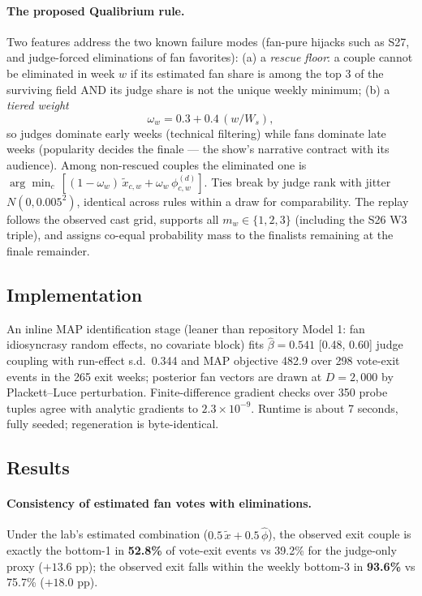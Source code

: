 \paragraph{The proposed Qualibrium rule.} Two features address the two known
failure modes (fan-pure hijacks such as S27, and judge-forced eliminations of fan
favorites): (a) a \emph{rescue floor}: a couple cannot be eliminated in week $w$
if its estimated fan share is among the top 3 of the surviving field AND its judge
share is not the unique weekly minimum; (b) a \emph{tiered weight}
\begin{equation}
\omega_w = 0.3 + 0.4\,(w/W_s),
\label{eq:omega}
\end{equation}
so judges dominate early weeks (technical filtering) while fans dominate late
weeks (popularity decides the finale --- the show's narrative contract with its
audience). Among non-rescued couples the eliminated one is
$\arg\min_c\,[(1-\omega_w)\,\tilde x_{c,w} + \omega_w\,\phi^{(d)}_{c,w}]$.
Ties break by judge rank with jitter $N(0, 0.005^2)$, identical across rules
within a draw for comparability. The replay follows the observed cast grid,
supports all $m_w \in \{1,2,3\}$ (including the S26 W3 triple), and assigns
co-equal probability mass to the finalists remaining at the finale remainder.

\subsection{Implementation}

An inline MAP identification stage (leaner than repository Model 1: fan
idiosyncrasy random effects, no covariate block) fits $\hat\beta = 0.541$
[0.48, 0.60] judge coupling with run-effect s.d.\ 0.344 and MAP objective 482.9
over 298 vote-exit events in the 265 exit weeks; posterior fan vectors are drawn
at $D = 2{,}000$ by Plackett--Luce perturbation. Finite-difference gradient checks
over 350 probe tuples agree with analytic gradients to $2.3 \times 10^{-9}$.
Runtime is about 7 seconds, fully seeded; regeneration is byte-identical.

\subsection{Results}

\paragraph{Consistency of estimated fan votes with eliminations.} Under the lab's
estimated combination ($0.5\,\tilde x + 0.5\,\hat\phi$), the observed exit couple
is exactly the bottom-1 in \textbf{52.8\%} of vote-exit events vs 39.2\% for the
judge-only proxy ($+13.6$ pp); the observed exit falls within the weekly bottom-3
in \textbf{93.6\%} vs 75.7\% ($+18.0$ pp).

